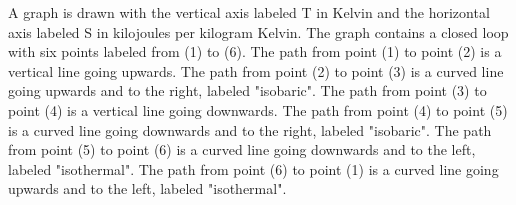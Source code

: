 A graph is drawn with the vertical axis labeled T in Kelvin and the horizontal axis labeled S in kilojoules per kilogram Kelvin. The graph contains a closed loop with six points labeled from (1) to (6). The path from point (1) to point (2) is a vertical line going upwards. The path from point (2) to point (3) is a curved line going upwards and to the right, labeled "isobaric". The path from point (3) to point (4) is a vertical line going downwards. The path from point (4) to point (5) is a curved line going downwards and to the right, labeled "isobaric". The path from point (5) to point (6) is a curved line going downwards and to the left, labeled "isothermal". The path from point (6) to point (1) is a curved line going upwards and to the left, labeled "isothermal".